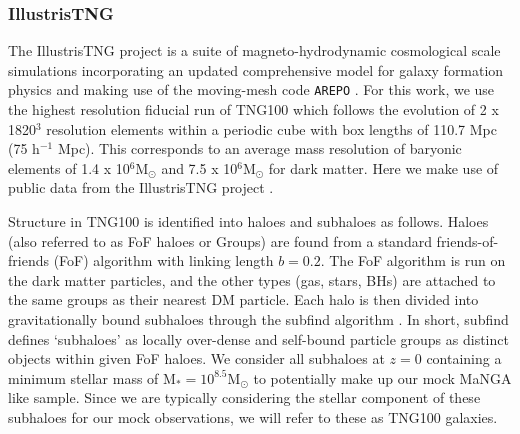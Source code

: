 \subsubsection{IllustrisTNG} 
The IllustrisTNG project \citep{marinacci18,naiman18,nelson18,pillepich18b,springel18} is a suite of magneto-hydrodynamic cosmological scale simulations incorporating an updated comprehensive model for galaxy formation physics \citep[as decribed in][]{weinberger17,pillepich18a} and making use of the moving-mesh code \texttt{AREPO} \citep{springel10,pakmor11,pakmor13}. For this work, we use the highest resolution fiducial run of TNG100 which follows the evolution of 2 x 1820$^3$ resolution elements within a periodic cube with box lengths of 110.7 Mpc (75 h$^{-1}$ Mpc). This corresponds to an average mass resolution of baryonic elements of 1.4 x 10$^6 \mathrm{M_{\odot}}$ and 7.5 x 10$^6 \mathrm{M_{\odot}}$ for dark matter. Here we make use of public data from the IllustrisTNG project \citep[as described in][]{nelson2019}.

Structure in TNG100 is identified into haloes and subhaloes as follows. Haloes (also referred to as FoF haloes or Groups) are found from a standard friends-of-friends (FoF) algorithm \citep{davis85} with linking length $b=0.2$. The FoF algorithm is run on the dark matter particles, and the other types (gas, stars, BHs) are attached to the same groups as their nearest DM particle. Each halo is then divided into gravitationally bound subhaloes through the subfind algorithm \citep{springel01}. In short, subfind defines `subhaloes' as locally over-dense and self-bound particle groups as distinct objects within given FoF haloes. We consider all subhaloes at $z=0$ containing a minimum stellar mass of $\mathrm{M_{\ast}} = 10^{8.5} \mathrm{M_{\odot}}$ to potentially make up our mock MaNGA like sample. Since we are typically considering the stellar component of these subhaloes for our mock observations, we will refer to these as TNG100 galaxies.

